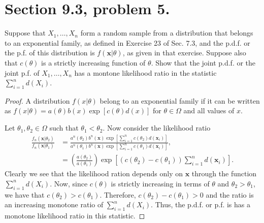 \documentclass{article}
\newcommand{\randsamp}{X_1,\dots,X_n}
\newcommand{\pdf}{p.d.f. }
\newenvironment{hwproof}[1]
{
    #1
    \begin{proof}
}{
    \end{proof}
}
\begin{document}
\section{Section 9.3, problem 5.}
\begin{hwproof}
    {
        Suppose that $\randsamp$ form a random sample from a distribution that belongs to an
        exponential family, as defined in Exercise 23 of Sec. 7.3, and the \pdf or the
        p.f. of this distribution is $f(\bm{x}|\theta)$, as given in that exercise. Suppose also
        that $c(\theta)$ is a strictly increasing function of $\theta$. Show that the joint \pdf
        or the joint p.f. of $\randsamp$ has a montone likelihood ratio in the statistic
        $\sum_{i=1}^n d(X_i)$.
    }
    A distribution $f(x|\theta)$ belong to an exponential family if it can be written as
    $f(x|\theta) = a(\theta)b(x)\exp[c(\theta)d(x)]$ for $\theta \in \Omega$ and
    all values of $x$.

    Let $\theta_1, \theta_2 \in \Omega$ such that $\theta_1 < \theta_2$. Now
    consider the likelihood ratio
    \begin{align*}
        \frac{f_n(\bm{x}|\theta_2)}{f_n(\bm{x}|\theta_1)} & =
        \frac{a^n(\theta_2)b^n(\bm{x})\exp\left[\sum_{i=1}^n c(\theta_2)d(\bm{x}_i)\right]}{a^n(\theta_1)b^n(\bm{x})\exp\left[\sum_{i=1}^n c(\theta_1)d(\bm{x}_i)\right]}, \\
                                                          & =
        \left(\frac{a(\theta_2)}{a(\theta_1)}\right)\exp\left[(c(\theta_2) - c(\theta_1)) \sum_{i=1}^n d(\bm{x}_i)\right].
    \end{align*}
    Clearly we see that the likelihood ration depends only on $\bm{x}$ through the function
    $\sum_{i=1}^n d(X_i)$. Now, since $c(\theta)$ is strictly increasing in terms of $\theta$
    and $\theta_2 > \theta_1$, we have that $c(\theta_2) > c(\theta_1)$. Therefore,
    $c(\theta_2) - c(\theta_1) > 0$ and the ratio is an increasing monotone ratio of
    $\sum_{i=1}^n d(X_i)$. Thus, the \pdf or p.f. is has a monotone likelihood ratio in this
    statistic.
\end{hwproof}
\end{document}
